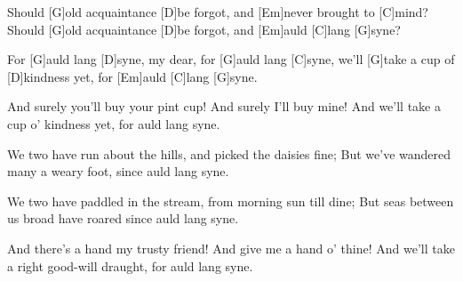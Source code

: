 
\begin{guitar}
	Should [G]old acquaintance [D]be forgot, and [Em]never brought to [C]mind?
	Should [G]old acquaintance [D]be forgot, and [Em]auld [C]lang [G]syne?
	
	For [G]auld lang [D]syne, my dear, for [G]auld lang [C]syne,
	we'll [G]take a cup of [D]kindness yet, for [Em]auld [C]lang [G]syne.
	
	And surely you'll buy your pint cup! And surely I'll buy mine!
	And we'll take a cup o' kindness yet, for auld lang syne.
	
	 
	
	We two have run about the hills, and picked the daisies fine;
	But we've wandered many a weary foot, since auld lang syne.
	
	 
	
	We two have paddled in the stream, from morning sun till dine;
	But seas between us broad have roared since auld lang syne.
	
	 
	
	And there's a hand my trusty friend! And give me a hand o' thine!
	And we'll take a right good-will draught, for auld lang syne.
	
	 
\end{guitar}